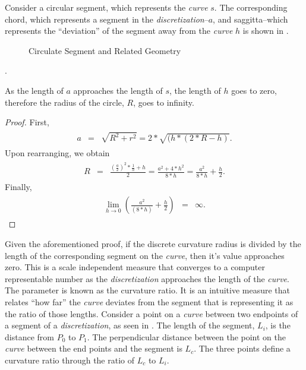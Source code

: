 Consider a circular segment, which represents the \textit{curve} $s$.  The corresponding chord, which represents a segment in the \textit{discretization}--$a$, and saggitta--which represents the ``deviation'' of the segment away from the \textit{curve} $h$ is shown in .

\begin{figure}
  \caption{\label{fig:CircleGeometry} Circulate Segment and Related Geometry}
\end{figure}.

\begin{theorem}
As the length of $a$ approaches the length of $s$, the length of $h$ goes 
to zero, therefore the radius of the circle, $R$, goes to infinity.  
\end{theorem}

\begin{proof}
First, 
\begin{eqnarray}
\begin{array}{lcl}
a & = & \sqrt{R^2+r^2}=2*\sqrt{(h*(2*R-h)}.
\end{array}
\end{eqnarray}
Upon rearranging, we obtain
\begin{eqnarray}
\begin{array}{lcl}
R & = & \frac{(\frac{a}{2})^2*\frac{1}{h}+h}{2}=
\frac{a^2+4*h^2}{8*h}=\frac{a^2}{8*h}+\frac{h}{2}.
\end{array}
\end{eqnarray}
Finally,
\begin{eqnarray}
\begin{array}{lcl}
\lim_{h\to0} (\frac{a^2}{(8*h)}+\frac{h}{2}) & = & \infty.
\end{array}
\end{eqnarray}
\end{proof}

Given the aforementioned proof, if the discrete curvature radius is divided by the length of the corresponding segment on the \textit{curve}, then it’s value approaches zero. This is a scale independent measure that converges to a computer representable number as the \textit{discretization} approaches the length of the \textit{curve}. The parameter is known as the curvature ratio. It is an intuitive measure that relates ``how far'' the \textit{curve} deviates from the segment that is representing it as the ratio of those lengths. Consider a point on a \textit{curve} between two endpoints of a segment of a \textit{discretization}, as seen in . The length of the segment, $L_i$, is the distance from $P_0$ to $P_1$. The perpendicular distance between the point on the \textit{curve} between the end points and the segment is $L_c$. The three points define a curvature ratio through the ratio of $L_c$ to $L_i$.

